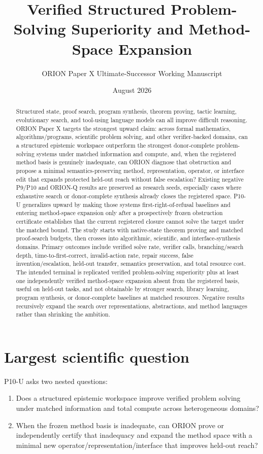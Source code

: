 \documentclass[11pt]{article}
\title{Verified Structured Problem-Solving Superiority and Method-Space Expansion}
\author{ORION Paper X Ultimate-Successor Working Manuscript}
\date{August 2026}
\begin{document}
\maketitle

\begin{abstract}
Structured state, proof search, program synthesis, theorem proving, tactic learning, evolutionary search, and tool-using language models can all improve difficult reasoning. ORION Paper X targets the strongest upward claim: across formal mathematics, algorithms/programs, scientific problem solving, and other verifier-backed domains, can a structured epistemic workspace outperform the strongest donor-complete problem-solving systems under matched information and compute, and, when the registered method basis is genuinely inadequate, can ORION diagnose that obstruction and propose a minimal semantics-preserving method, representation, operator, or interface edit that expands protected held-out reach without false escalation? Existing negative P9/P10 and ORION-Q results are preserved as research seeds, especially cases where exhaustive search or donor-complete synthesis already closes the registered space. P10-U generalizes upward by making those systems first-right-of-refusal baselines and entering method-space expansion only after a prospectively frozen obstruction certificate establishes that the current registered closure cannot solve the target under the matched bound. The study starts with native-state theorem proving and matched proof-search budgets, then crosses into algorithmic, scientific, and interface-synthesis domains. Primary outcomes include verified solve rate, verifier calls, branching/search depth, time-to-first-correct, invalid-action rate, repair success, false invention/escalation, held-out transfer, semantics preservation, and total resource cost. The intended terminal is replicated verified problem-solving superiority plus at least one independently verified method-space expansion absent from the registered basis, useful on held-out tasks, and not obtainable by stronger search, library learning, program synthesis, or donor-complete baselines at matched resources. Negative results recursively expand the search over representations, abstractions, and method languages rather than shrinking the ambition.
\end{abstract}

\section{Largest scientific question}
P10-U asks two nested questions:
\begin{enumerate}
    \item Does a structured epistemic workspace improve verified problem solving under matched information and total compute across heterogeneous domains?
    \item When the frozen method basis is inadequate, can ORION prove or independently certify that inadequacy and expand the method space with a minimal new operator/representation/interface that improves held-out reach?
\end{enumerate}
\end{document}
